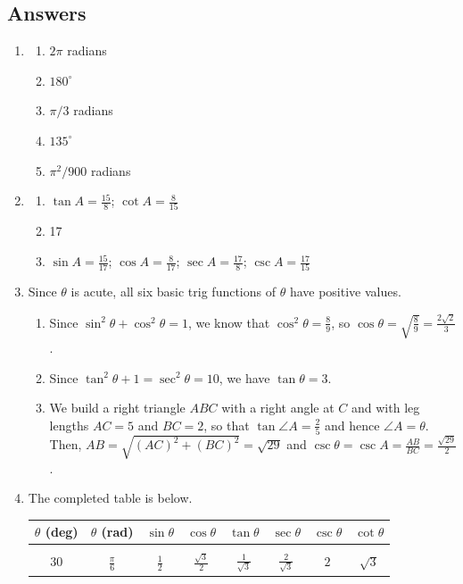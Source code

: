 \newpage
\subsection{Answers}

\begin{enumerate}
\item \begin{enumerate}
\item $2\pi$ radians
\item $180^{\circ}$
\item $\pi/3$ radians
\item $135^{\circ}$
\item $\pi^2/900$ radians
\end{enumerate}
\item \begin{enumerate}
\item $\tan A = \frac{15}{8}$; $\cot A = \frac{8}{15}$
\item 17
\item $\sin A = \frac{15}{17}$; $\cos A = \frac{8}{17}$; $\sec A = \frac{17}{8}$; $\csc A = \frac{17}{15}$
\end{enumerate}
\item Since $\theta$ is acute, all six basic trig functions of $\theta$ have positive values.
\begin{enumerate}
\item Since $\sin^2\theta + \cos^2\theta = 1$, we know that $\cos^2\theta = \frac{8}{9}$, so $\cos\theta = \sqrt{\frac{8}{9}} = \frac{2\sqrt{2}}{3}$.
\item Since $\tan^2\theta + 1 = \sec^2\theta = 10$, we have $\tan\theta = 3$.
\item We build a right triangle $ABC$ with a right angle at $C$ and with leg lengths $AC = 5$ and $BC = 2$, so that $\tan\angle A = \frac{2}{5}$ and hence $\angle A = \theta$. Then, $AB = \sqrt{(AC)^2 + (BC)^2} = \sqrt{29}$ and $\csc\theta = \csc A = \frac{AB}{BC} = \frac{\sqrt{29}}{2}$.
\end{enumerate}
\item The completed table is below.
\begin{table}[H]
\centering
\begin{tabular}{c|c||c|c|c|c|c|c}
$\theta$ (deg) & $\theta$ (rad) & $\sin\theta$ & $\cos\theta$ & $\tan\theta$ & $\sec\theta$ & $\csc\theta$ & $\cot\theta$ \\ \hline
& & & & & & & \\
$30$ & $\frac{\pi}{6}$ & $\frac{1}{2}$ & $\frac{\sqrt{3}}{2}$ & $\frac{1}{\sqrt{3}}$ & $\frac{2}{\sqrt{3}}$ & $2$ & $\sqrt{3}$ \\

\end{tabular}
\end{table}
\end{enumerate}
